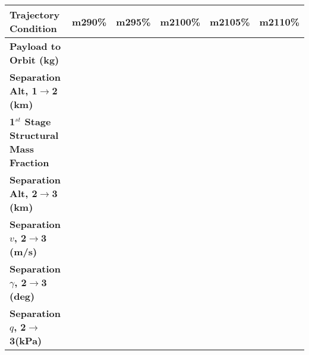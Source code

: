 \section{}
\begin{table}[ht]
\begin{tabular}{l c c c c c} 
	\hline \textbf{Trajectory Condition}
	&m290\%
	&m295\%
	&m2100\%
	&m2105\%
	&m2110\%
	\\
	\hline \textbf{Payload to Orbit (kg)}
	& \PayloadToOrbitmSPARTANninetypercent
	& \PayloadToOrbitmSPARTANninetyfivepercent
	& \PayloadToOrbitmSPARTANonehundredpercent
	& \PayloadToOrbitmSPARTANonehundredandfivepercent
	& \PayloadToOrbitmSPARTANonehundredandtenpercent
	\\
	\textbf{Separation Alt, 1$\rightarrow$2 (km)}
	& \firstsecondSeparationAltmSPARTANninetypercent
	& \firstsecondSeparationAltmSPARTANninetyfivepercent
	& \firstsecondSeparationAltmSPARTANonehundredpercent
	& \firstsecondSeparationAltmSPARTANonehundredandfivepercent
	& \firstsecondSeparationAltmSPARTANonehundredandtenpercent
	\\
	\textbf{1$^{st}$ Stage Structural Mass Fraction}
	& \FirstStageSMFmSPARTANninetypercent
	& \FirstStageSMFmSPARTANninetyfivepercent
	& \FirstStageSMFmSPARTANonehundredpercent
	& \FirstStageSMFmSPARTANonehundredandfivepercent
	& \FirstStageSMFmSPARTANonehundredandtenpercent
	\\
	\textbf{Separation Alt, 2$\rightarrow$3 (km)}
	& \secondthirdSeparationAltmSPARTANninetypercent
	& \secondthirdSeparationAltmSPARTANninetyfivepercent
	& \secondthirdSeparationAltmSPARTANonehundredpercent
	& \secondthirdSeparationAltmSPARTANonehundredandfivepercent
	& \secondthirdSeparationAltmSPARTANonehundredandtenpercent
	\\
	\textbf{Separation $v$, 2$\rightarrow$3 (m/s)}
	& \secondthirdSeparationvmSPARTANninetypercent
	& \secondthirdSeparationvmSPARTANninetyfivepercent
	& \secondthirdSeparationvmSPARTANonehundredpercent
	& \secondthirdSeparationvmSPARTANonehundredandfivepercent
	& \secondthirdSeparationvmSPARTANonehundredandtenpercent
	\\
	\textbf{Separation $\gamma$, 2$\rightarrow$3 (deg)}
	& \secondthirdSeparationgammamSPARTANninetypercent
	& \secondthirdSeparationgammamSPARTANninetyfivepercent
	& \secondthirdSeparationgammamSPARTANonehundredpercent
	& \secondthirdSeparationgammamSPARTANonehundredandfivepercent
	& \secondthirdSeparationgammamSPARTANonehundredandtenpercent
	\\
	\textbf{Separation $q$, 2$\rightarrow$3(kPa)}
	& \secondthirdSeparationqmSPARTANninetypercent

\end{tabular}
\end{table}
